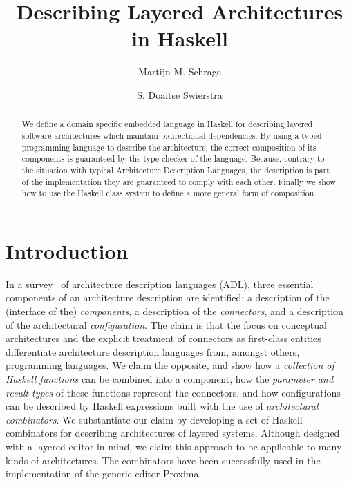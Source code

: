 \documentclass{llncs}
\renewcommand{\emph}[1]{{\em #1}}
\begin{document}
\title{Describing Layered Architectures in Haskell}

\author{Martijn M. Schrage \and S. Doaitse Swierstra}

\maketitle

\begin{abstract}
We define a domain specific embedded language in Haskell for describing
layered software architectures which maintain bidirectional dependencies. By using a typed programming
language to describe the architecture, the correct composition of its components
is guaranteed by the type checker of the language. Because, contrary to the situation with typical Architecture Description Languages, the
description is part of the implementation they are guaranteed to comply with each other. Finally we show how to use the Haskell class system to define a more general form of composition.
\end{abstract}



\section{Introduction}\label{sect:introduction}

In a survey~\cite{medvidovic00ADLs} of architecture description languages (ADL), three essential components of an architecture description are identified: a description of the (interface of the) \emph{components}, a description of the \emph{connectors}, and a description of the architectural \emph{configuration}. The claim is that the focus on conceptual architectures and the explicit treatment of connectors as first-class entities differentiate architecture description languages from, amongst others, programming languages. We claim the opposite, and show how a \emph{collection of Haskell functions} can be combined into a component, how the \emph{parameter and result types} of these functions represent the connectors, and how configurations can be described by Haskell expressions built with the use of \emph{architectural combinators}. We substantiate our claim by developing a set of Haskell combinators for describing architectures of layered systems. Although designed with a layered editor in mind, we claim this approach to be applicable to many kinds of architectures. The combinators have been successfully used in the implementation of the generic editor Proxima~\cite{Schrage04Proxima}.
\end{document}
